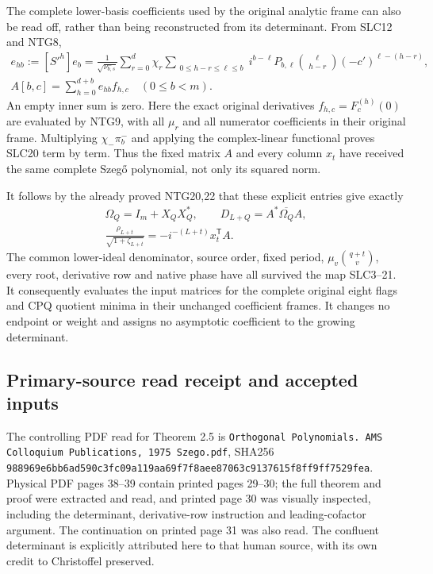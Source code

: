 \documentclass[11pt,a4paper]{article}
\begin{document}
The complete lower-basis coefficients used by the original
analytic frame can also be read off, rather than being
reconstructed from its determinant. From SLC12 and NTG8,
\[
\begin{gathered}
 e_{hb}:=[S'^h]e_b
 =\frac{1}{\sqrt{\nu_{b,s}^-}}
   \sum_{r=0}^{d}\chi_r
      \sum_{\substack{0\le h-r\le\ell\le b}}
          i^{b-\ell}P_{b,\ell}
          \binom{\ell}{h-r}(-c')^{\ell-(h-r)},\\
 A[b,c]=\sum_{h=0}^{d+b}e_{hb} f_{h,c}\quad(0\le b<m).
\end{gathered}                                                    \tag{SLC20}
\]
An empty inner sum is zero. Here the exact original
derivatives $f_{h,c}=F_c^{(h)}(0)$ are evaluated by NTG9,
with all $\mu_r$ and all numerator coefficients in their
original frame. Multiplying $\chi_-\pi_b^-$ and applying
the complex-linear functional proves SLC20 term by term.
Thus the fixed matrix $A$ and every column $x_t$ have
received the same complete Szeg\H{o} polynomial, not only
its squared norm.

It follows by the already proved NTG20,22 that these
explicit entries give exactly
\[
\begin{gathered}
 \Omega_Q=I_m+X_QX_Q^*,\qquad
 D_{L+Q}=A^*\overline{\Omega_Q}A,\\
 \frac{\rho_{L+t}}{\sqrt{1+\zeta_{L+t}}}
           =-i^{-(L+t)}x_t^{\mathsf T}A .
\end{gathered}                                                    \tag{SLC21}
\]
The common lower-ideal denominator, source order,
fixed period, $\mu_v\binom{q+t}{v}$, every root,
derivative row and native phase have all survived
the map SLC3--21. It consequently evaluates the
input matrices for the complete original eight
flags and CPQ quotient minima in their unchanged
coefficient frames. It changes no endpoint or
weight and assigns no asymptotic coefficient
to the growing determinant.

\subsection{Primary-source read receipt and accepted inputs}
\begingroup\raggedright
The controlling PDF read for Theorem 2.5 is
\texttt{Orthogonal Polynomials. AMS Colloquium Publications,
1975 Szego.pdf}, SHA256
\texttt{988969e6\allowbreak bb6ad590\allowbreak c3fc09a1\allowbreak 19aa69f7\allowbreak f8aee870\allowbreak 63c91376\allowbreak 15f8ff9f\allowbreak f7529fea}.
Physical PDF pages 38--39 contain printed pages 29--30;
the full theorem and proof were extracted and read,
and printed page 30 was visually inspected, including
the determinant, derivative-row instruction and
leading-cofactor argument. The continuation on
printed page 31 was also read. The confluent determinant
is explicitly attributed here to that human source,
with its own credit to Christoffel preserved.
\end{document}
